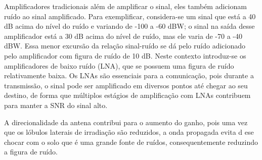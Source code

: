 \begin{subquestion}
    \item Amplificadores tradicionais além de amplificar o sinal, eles também adicionam ruído ao sinal amplificado. Para exemplificar, considera-se um sinal que está a 40 dB acima do nível do ruído e variando de -100 a -60 dBW; o sinal na saída desse amplificador está a 30 dB acima do nível de ruído, mas ele varia de -70 a -40 dBW. Essa menor excursão da relação sinal-ruído se dá pelo ruído adicionado pelo amplificador com figura de ruído de 10 dB. Neste contexto introduz-se os amplificadores de baixo ruído (LNA), que se possuem uma figura de ruído relativamente baixa. Os LNAs são essenciais para a comunicação, pois durante a transmissão, o sinal pode ser amplificado em diversos pontos até chegar ao seu destino, de forma que múltiplos estágios de amplificação com LNAs contribuem para manter a SNR do sinal alto.
    \item A direcionalidade da antena contribui para o aumento do ganho, pois uma vez que os lóbulos laterais de irradiação são reduzidos, a onda propagada evita d ese chocar com o solo que é uma grande fonte de ruídos, consequentemente reduzindo a figura de ruído.
\end{subquestion}